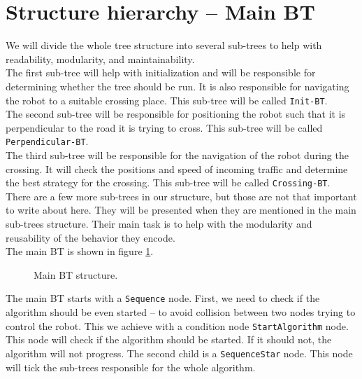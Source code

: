\section{Structure hierarchy -- Main BT}
    We will divide the whole tree structure into several sub-trees to help with readability, modularity, and maintainability.\\
    The first sub-tree will help with initialization and will be responsible for determining whether the tree should be run. It is also responsible for navigating the robot to a suitable crossing place. This sub-tree will be called \texttt{Init-BT}.\\
    The second sub-tree will be responsible for positioning the robot such that it is perpendicular to the road it is trying to cross. This sub-tree will be called \texttt{Perpendicular-BT}.\\
    The third sub-tree will be responsible for the navigation of the robot during the crossing. It will check the positions and speed of incoming traffic and determine the best strategy for the crossing. This sub-tree will be called \texttt{Crossing-BT}.\\
    There are a few more sub-trees in our structure, but those are not that important to write about here. They will be presented when they are mentioned in the main sub-trees structure. Their main task is to help with the modularity and reusability of the behavior they encode.\\
    The main BT is shown in figure \ref{fig:main-BT}.\\
    \begin{figure}[ht]
        \caption{Main BT structure.}
        \label{fig:main-BT}
    \end{figure}
    The main BT starts with a \texttt{Sequence} node. First, we need to check if the algorithm should be even started -- to avoid collision between two nodes trying to control the robot. This we achieve with a condition node \texttt{StartAlgorithm} node. This node will check if the algorithm should be started. If it should not, the algorithm will not progress. The second child is a \texttt{SequenceStar} node. This node will tick the sub-trees responsible for the whole algorithm.\\
